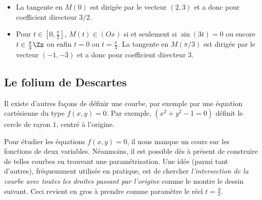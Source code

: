 \documentclass[class=report,crop=false]{standalone}
\begin{document}
\begin{exemple}
\begin{itemize}
\begin{itemize}
    \item La tangente en $M(0)$ est dirigée par le vecteur $(2,3)$
et a donc pour coefficient directeur $3/2$.

    \item Pour $t\in[0,\frac{\pi}{2}]$, $M(t)\in(Ox)$ si et
seulement si $\sin(3t)=0$ ou encore $t\in\frac{\pi}{3}\Zz$ ou
enfin $t=0$ ou $t=\frac{\pi}{3}$. La tangente en
$M(\pi/3)$ est dirigée par le vecteur $(-1,-3)$ et a donc pour
coefficient directeur $3$.
    \end{itemize}
  \end{itemize}



\end{exemple}



\subsection{Le folium de Descartes}


Il existe d'autres façons de définir une courbe, par exemple par une équation
cartésienne du type $f(x,y)=0$.
Par exemple, $(x^2+y^2-1=0)$ définit le cercle de rayon $1$, centré à l'origine.

Pour étudier les équations $f(x,y)=0$, il nous manque un cours sur les
fonctions de deux variables. Néanmoins, il est possible dès à présent
de construire de telles courbes en trouvant une paramétrisation.
Une idée (parmi tant d'autres), fréquemment utilisée en pratique,
est de chercher \emph{l'intersection de la courbe avec toutes les droites
passant par l'origine} comme le montre le dessin suivant. Ceci revient
en gros à prendre comme paramètre le réel $t=\frac{y}{x}$.

\end{document}
